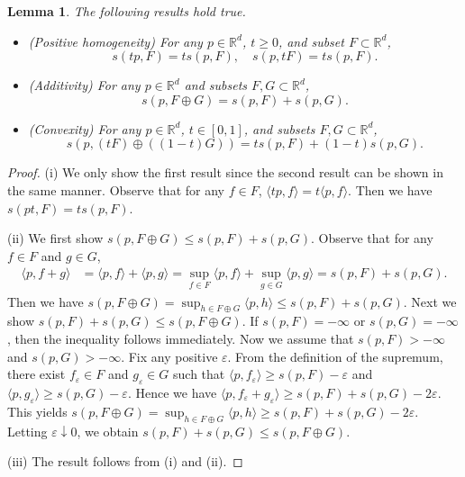 \documentclass[11pt,reqno]{amsart}
\newtheorem{lemma}{Lemma}
\begin{document}
\begin{lemma}\label{lem:sf-add-conv}
The following results hold true. 
\begin{itemize}
\item[(i)] (Positive homogeneity) For any $p \in \mathbb{R}^d$, $t \geq 0$, and subset $F \subset \mathbb{R}^d$,  
\[
s(tp, F) = ts(p,F),\quad s(p, t F) = ts(p,F). 
\] 
\item[(ii)] (Additivity) For any $p \in \mathbb{R}^d$ and subsets $F, G \subset \mathbb{R}^d$, 
\[
s(p, F \oplus G) = s(p, F) + s(p, G).
\] 
\item[(iii)] (Convexity) For any $p \in \mathbb{R}^d$, $t \in [0,1]$, and subsets $F, G \subset \mathbb{R}^d$,
\[
s(p, (t F) \oplus ((1-t) G)) = ts(p,F) + (1-t)s(p,G).
\] 
\end{itemize}
\end{lemma}
\begin{proof}
(i) We only show the first result since the second result can be shown in the same manner. Observe that for any $f \in F$, $\langle tp, f\rangle = t\langle p, f\rangle$. Then we have $s(pt, F) = ts(p,F)$. 

\noindent
(ii) %
We first show $s(p, F \oplus G) \leq s(p,F) + s(p,G)$. Observe that for any $f \in F$ and $g \in G$, 
\begin{align*}
\langle p, f + g \rangle 
&= \langle p, f\rangle + \langle p, g \rangle
= \sup_{f \in F}\langle p, f \rangle + \sup_{g \in G}\langle p, g\rangle = s(p,F) + s(p,G). 
\end{align*}
Then we have $s(p, F \oplus G) = \sup_{h \in F \oplus G}\langle p, h \rangle \leq s(p,F) + s(p,G)$. Next we show $s(p, F) + s(p,G) \leq s(p, F \oplus G)$. If $s(p, F)=-\infty$ or $s(p,G) = -\infty$, then the inequality follows immediately. Now we assume that $s(p,F)>-\infty$ and $s(p,G)>-\infty$. Fix any positive $\varepsilon$. From the definition of the supremum, there exist $f_\varepsilon \in F$ and $g_\varepsilon \in G$ such that $\langle p, f_\varepsilon \rangle  \geq s(p, F) - \varepsilon$ and $\langle p, g_\varepsilon \rangle  \geq s(p, G)-\varepsilon$. Hence we have $\langle p, f_\varepsilon + g_\varepsilon \rangle  \geq s(p, F) + s(p, G) - 2\varepsilon$. This yields $s(p, F\oplus G)=\sup_{h \in F \oplus G}\langle p, h \rangle \geq s(p, F) + s(p, G) - 2\varepsilon$. Letting $\varepsilon \downarrow 0$, we obtain $s(p, F) + s(p,G) \leq s(p, F \oplus G)$. 

\noindent
(iii) The result follows from (i) and (ii). 
\end{proof}
\end{document}

